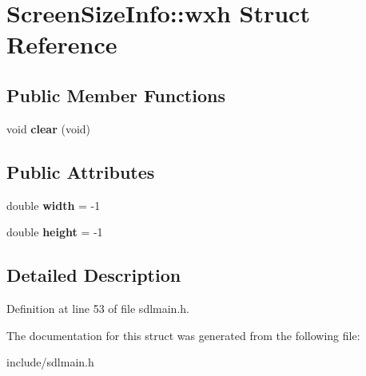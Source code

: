 \hypertarget{structScreenSizeInfo_1_1wxh}{\section{Screen\-Size\-Info\-:\-:wxh Struct Reference}
\label{structScreenSizeInfo_1_1wxh}
}
\subsection*{Public Member Functions}
\begin{DoxyCompactItemize}
\item 
\hypertarget{structScreenSizeInfo_1_1wxh_a1ddd72bce5ea48b234990d88be4e3ce1}{void {\bfseries clear} (void)}\label{structScreenSizeInfo_1_1wxh_a1ddd72bce5ea48b234990d88be4e3ce1}

\end{DoxyCompactItemize}
\subsection*{Public Attributes}
\begin{DoxyCompactItemize}
\item 
\hypertarget{structScreenSizeInfo_1_1wxh_a15263d1927c2d919edcf9cf3f3b60038}{double {\bfseries width} = -\/1}\label{structScreenSizeInfo_1_1wxh_a15263d1927c2d919edcf9cf3f3b60038}

\item 
\hypertarget{structScreenSizeInfo_1_1wxh_a615a741428eee20e8e9e07595354ce61}{double {\bfseries height} = -\/1}\label{structScreenSizeInfo_1_1wxh_a615a741428eee20e8e9e07595354ce61}

\end{DoxyCompactItemize}


\subsection{Detailed Description}


Definition at line 53 of file sdlmain.\-h.



The documentation for this struct was generated from the following file\-:\begin{DoxyCompactItemize}
\item 
include/sdlmain.\-h\end{DoxyCompactItemize}
